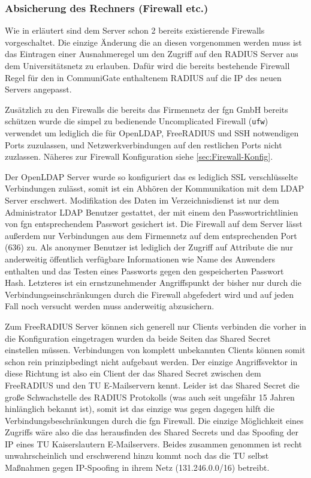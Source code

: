 \documentclass[11pt,a4paper,titlepage=firstiscover,headsepline]{scrartcl} %
\begin{document}
\subsubsection{Absicherung des Rechners (Firewall etc.)}
Wie in  erläutert sind dem Server schon 2 bereits existierende Firewalls vorgeschaltet. Die einzige Änderung die an diesen vorgenommen werden muss ist das Eintragen einer Ausnahmeregel um den Zugriff auf den RADIUS Server aus dem Universitätsnetz zu erlauben. Dafür wird die bereits bestehende Firewall Regel für den in CommuniGate enthaltenem RADIUS auf die IP des neuen Servers angepasst.

Zusätzlich zu den Firewalls die bereits das Firmennetz der fgn GmbH bereits schützen wurde die simpel zu bedienende Uncomplicated Firewall (\texttt{ufw}) verwendet um lediglich die für OpenLDAP, FreeRADIUS und SSH notwendigen Ports zuzulassen, und Netzwerkverbindungen auf den restlichen Ports nicht zuzlassen. Näheres zur Firewall Konfiguration siehe \autoref{sec:Firewall-Konfig}.

Der OpenLDAP Server wurde so konfiguriert das es lediglich SSL verschlüsselte Verbindungen zulässt, somit ist ein Abhören der Kommunikation mit dem LDAP Server erschwert. Modifikation des Daten im Verzeichnisdienst ist nur dem Administrator LDAP Benutzer gestattet, der mit einem den Passwortrichtlinien von fgn entsprechendem Passwort gesichert ist. Die Firewall auf dem Server lässt außerdem nur Verbindungen aus dem Firmennetz auf dem entsprechenden Port (636) zu. Als anonymer Benutzer ist lediglich der Zugriff auf Attribute die nur anderweitig öffentlich verfügbare Informationen wie Name des Anwenders enthalten und das Testen eines Passworts gegen den gespeicherten Passwort Hash. Letzteres ist ein ernstzunehmender Angriffspunkt der bisher nur durch die Verbindungseinschränkungen durch die Firewall abgefedert wird und auf jeden Fall noch versucht werden muss anderweitig abzusichern.

Zum FreeRADIUS Server können sich generell nur Clients verbinden die vorher in die Konfiguration eingetragen wurden da beide Seiten das Shared Secret einstellen müssen. Verbindungen von komplett unbekannten Clients können somit schon rein prinzipbedingt nicht aufgebaut werden. Der einzige Angriffsvektor in diese Richtung ist also ein Client der das Shared Secret zwischen dem FreeRADIUS und den TU E-Mailservern kennt. Leider ist das Shared Secret die große Schwachstelle des RADIUS Protokolls (was auch seit ungefähr 15 Jahren hinlänglich bekannt ist), somit ist das einzige was gegen dagegen hilft die Verbindungsbeschränkungen durch die fgn Firewall. Die einzige Möglichkeit eines Zugriffs wäre also die das herausfinden des Shared Secrets und das Spoofing der IP eines TU Kaiserslautern E-Mailservers. Beides zusammen genommen ist recht unwahrscheinlich und erschwerend hinzu kommt noch das die TU selbst Maßnahmen gegen IP-Spoofing in ihrem Netz (131.246.0.0/16) betreibt.
\end{document}
